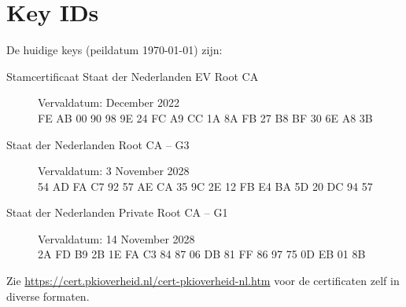 \documentclass[11.0pt,twoside,openright]{report}
\begin{document}
\appendix
\chapter{Key IDs}
\label{keyid}

De huidige keys (peildatum \today) zijn:\\

\begin{description}
\item[Stamcertificaat Staat der Nederlanden EV Root CA]  Vervaldatum: December 2022 \\

FE AB 00 90 98 9E 24 FC A9 CC 1A 8A FB 27 B8 BF 30 6E A8 3B \\

\item[Staat der Nederlanden Root CA -- G3] Vervaldatum: 3 November 2028 \\

54 AD FA C7 92 57 AE CA 35 9C 2E 12 FB E4 BA 5D 20 DC 94 57 \\

\item[Staat der Nederlanden Private Root CA -- G1] Vervaldatum: 14 November 2028  \\

2A FD B9 2B 1E FA C3 84 87 06 DB 81 FF 86 97 75 0D EB 01 8B \\
\end{description}

Zie \url{https://cert.pkioverheid.nl/cert-pkioverheid-nl.htm} voor de certificaten zelf in diverse formaten.
\end{document}
